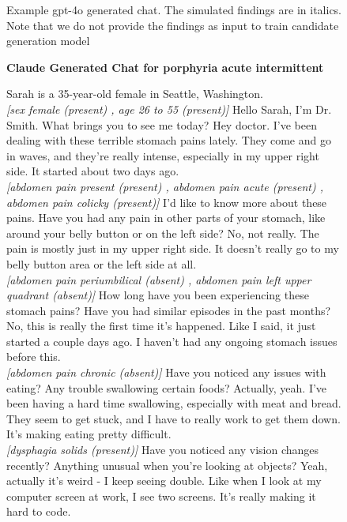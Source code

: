 \begin{figure*}[p]
\caption{Example gpt-4o generated chat.  The simulated findings are in italics. Note that we do not provide the findings as input to train candidate generation model }\label{fig:example_gpt4o}

\end{figure*}

\begin{figure*}[p]
\begin{tcolorbox}[boxsep=2pt,left=2pt,right=2pt,top=2pt,bottom=2pt,colback=White,]
\textbf{Claude Generated Chat for porphyria acute intermittent}
\vspace{-2em}
\begin{chat}
 Sarah is a 35-year-old female in Seattle, Washington.
\\\textit{[sex female (present) , age 26 to 55 (present)]}
 Hello Sarah, I'm Dr. Smith. What brings you to see me today?
 Hey doctor. I've been dealing with these terrible stomach pains lately. They come and go in waves, and they're really intense, especially in my upper right side. It started about two days ago.
\\\textit{[abdomen pain present (present) , abdomen pain acute (present) , abdomen pain colicky (present)]}
 I'd like to know more about these pains. Have you had any pain in other parts of your stomach, like around your belly button or on the left side?
 No, not really. The pain is mostly just in my upper right side. It doesn't really go to my belly button area or the left side at all.
\\\textit{[abdomen pain periumbilical (absent) , abdomen pain left upper quadrant (absent)]}
 How long have you been experiencing these stomach pains? Have you had similar episodes in the past months?
 No, this is really the first time it's happened. Like I said, it just started a couple days ago. I haven't had any ongoing stomach issues before this.
\\\textit{[abdomen pain chronic (absent)]}
 Have you noticed any issues with eating? Any trouble swallowing certain foods?
 Actually, yeah. I've been having a hard time swallowing, especially with meat and bread. They seem to get stuck, and I have to really work to get them down. It's making eating pretty difficult.
\\\textit{[dysphagia solids (present)]}
 Have you noticed any vision changes recently? Anything unusual when you're looking at objects?
 Yeah, actually it's weird - I keep seeing double. Like when I look at my computer screen at work, I see two screens. It's really making it hard to code.

\end{chat}
\end{tcolorbox}
\end{figure*}
